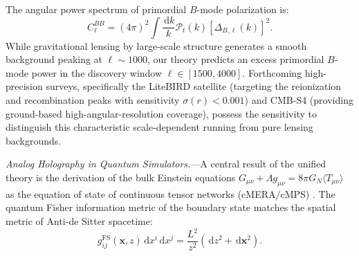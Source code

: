 \documentclass[aps,prl,reprint,twocolumn,superscriptaddress,nofootinbib,floatfix]{revtex4-2}
\newcommand{\dif}{\,\mathrm{d}}
\begin{document}
The angular power spectrum of primordial $B$-mode polarization is:
\begin{equation}
    C_\ell^{BB} = (4\pi)^2 \int \frac{\dif k}{k} \mathcal{P}_t(k) \left[ \Delta_{B, \ell}(k) \right]^2.
\end{equation}
While gravitational lensing by large-scale structure generates a smooth background peaking at $\ell \sim 1000$, our theory predicts an excess primordial $B$-mode power in the discovery window $\ell \in [1500, 4000]$. Forthcoming high-precision surveys, specifically the LiteBIRD satellite \cite{hazumi2019litebird} (targeting the reionization and recombination peaks with sensitivity $\sigma(r) < 0.001$) and CMB-S4 \cite{abazajian2016cmb} (providing ground-based high-angular-resolution coverage), possess the sensitivity to distinguish this characteristic scale-dependent running from pure lensing backgrounds.

\emph{Analog Holography in Quantum Simulators.}---A central result of the unified theory is the derivation of the bulk Einstein equations $G_{\mu\nu} + \Lambda g_{\mu\nu} = 8\pi G_N \langle T_{\mu\nu} \rangle$ as the equation of state of continuous tensor networks (cMERA/cMPS) \cite{turing2026spacetime}. The quantum Fisher information metric of the boundary state matches the spatial metric of Anti-de Sitter spacetime:
\begin{equation}
    g_{ij}^{\mathrm{FS}}(\mathbf{x}, z) \dif x^i \dif x^j = \frac{L^2}{z^2} \left( \dif z^2 + \dif \mathbf{x}^2 \right).
\end{equation}
\end{document}
